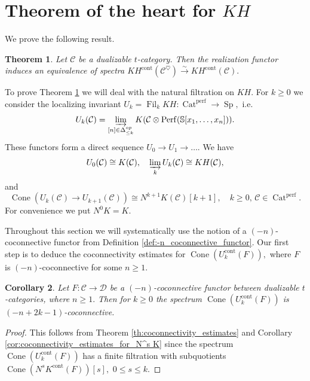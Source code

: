 \documentclass[11pt,leqno]{amsart}
\newtheorem{theo}{Theorem}[section]
\newtheorem{cor}[theo]{Corollary}
\numberwithin{equation}{section}
\def\bS{\mathbb{S}}
\newcommand{\indlim}[1][]{\mathop{\varinjlim}\limits_{#1}}
\newcommand{\xto}{\xrightarrow}
\newcommand{\Cat}{\operatorname{Cat}}
\newcommand{\Cone}{\operatorname{Cone}}
\newcommand{\cont}{\operatorname{cont}}
\newcommand{\Fil}{\operatorname{Fil}}
\newcommand{\cD}{{\mathcal D}}
\newcommand{\cC}{{\mathcal C}}
\newcommand{\Perf}{\operatorname{Perf}}
\newcommand{\perf}{\operatorname{perf}}
\newcommand{\Sp}{\operatorname{Sp}}
\begin{document}
\section{Theorem of the heart for $KH$}
\label{sec:th_of_the_heart_for_KH}

We prove the following result.

\begin{theo}\label{th:theorem_of_the_heart_for_KH}
Let $\cC$ be a dualizable $t$-category. Then the realization functor induces an equivalence of spectra $KH^{\cont}(\cC^{\heartsuit})\xto{\sim} KH^{\cont}(\cC).$
\end{theo}

To prove Theorem \ref{th:theorem_of_the_heart_for_KH} we will deal with the natural filtration on $KH.$ For $k\geq 0$ we consider the localizing invariant $U_k=\Fil_k KH:\Cat^{\perf}\to \Sp,$ i.e.
\begin{equation}\label{eq:definition_of_U_k}
U_k(\cC) = \indlim[\substack{[n]\in \Delta_{\leq k}^{op}}] K(\cC\otimes \Perf(\bS[x_1,\dots,x_n])).
\end{equation}
These functors form a direct sequence $U_0\to U_1\to\dots.$ We have 
\begin{equation*}
U_0(\cC)\cong K(\cC),\quad \indlim[k]U_k(\cC)\cong KH(\cC),
\end{equation*}
and
\begin{equation*}
\Cone(U_k(\cC)\to U_{k+1}(\cC))\cong N^{k+1} K(\cC)[k+1],\quad k\geq 0,\,\cC\in\Cat^{\perf}. 
\end{equation*}
For convenience we put $N^0 K = K.$

Throughout this section we will systematically use the notion of a $(-n)$-coconnective functor from Definition \ref{def:-n_coconnective_functor}. Our first step is to deduce the coconnectivity estimates for $\Cone(U_k^{\cont}(F)),$ where $F$ is $(-n)$-coconnective for some $n\geq 1.$

\begin{cor}\label{cor:coconnectivity_estimates_for_U_k}
Let $F:\cC\to\cD$ be a $(-n)$-coconnective functor between dualizable $t$-categories, where $n\geq 1.$ Then for $k\geq 0$ the spectrum $\Cone(U_k^{\cont}(F))$ is $(-n+2k-1)$-coconnective.
\end{cor}

\begin{proof}
This follows from Theorem \ref{th:coconnectivity_estimates} and Corollary \ref{cor:coconnectivity_estimates_for_N^s K} since the spectrum $\Cone(U_k^{\cont}(F))$ has a finite filtration with subquotients $\Cone(N^s K^{\cont}(F))[s],$ $0\leq s\leq k.$
\end{proof}
\end{document}
